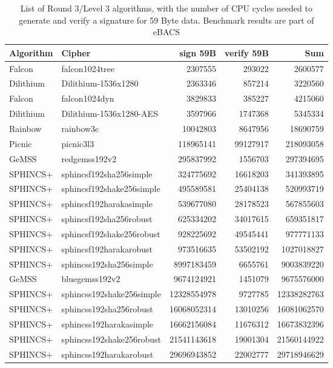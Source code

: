 \begin{table}[ht]
  \small
  \caption{List of Round 3/Level 3 algorithms, with the number of CPU cycles needed to generate and verify a signature for 59 Byte data. Benchmark results are part of eBACS\cite{eBACS}}
  \begin{center}
      \begin{tabularx}{\textwidth}{X|lrrr}
      \hline
      \textbf{Algorithm} & \textbf{Cipher}  & \textbf{sign 59B}  & \textbf{verify 59B}  & \textbf{Sum}  \\
      \hline
      Falcon & falcon1024tree & 2307555 & 293022 & 2600577 \\
      Dilithium & Dilithium-1536x1280 & 2363346 & 857214 & 3220560 \\
      Falcon & falcon1024dyn & 3829833 & 385227 & 4215060 \\
      Dilithium & Dilithium-1536x1280-AES & 3597966 & 1747368 & 5345334 \\
      Rainbow & rainbow3c & 10042803 & 8647956 & 18690759 \\
      Picnic & picnic3l3 & 118965141 & 99127917 & 218093058 \\
      GeMSS & redgemss192v2 & 295837992 & 1556703 & 297394695 \\
      SPHINCS+ & sphincsf192sha256simple & 324775692 & 16618203 & 341393895 \\
      SPHINCS+ & sphincsf192shake256simple & 495589581 & 25404138 & 520993719 \\
      SPHINCS+ & sphincsf192harakasimple & 539677080 & 28178523 & 567855603 \\
      SPHINCS+ & sphincsf192sha256robust & 625334202 & 34017615 & 659351817 \\
      SPHINCS+ & sphincsf192shake256robust & 928225692 & 49545441 & 977771133 \\
      SPHINCS+ & sphincsf192harakarobust & 973516635 & 53502192 & 1027018827 \\
      SPHINCS+ & sphincss192sha256simple & 8997183459 & 6655761 & 9003839220 \\
      GeMSS & bluegemss192v2 & 9674124921 & 1451079 & 9675576000 \\
      SPHINCS+ & sphincss192shake256simple & 12328554978 & 9727785 & 12338282763 \\
      SPHINCS+ & sphincss192sha256robust & 16068052314 & 13010256 & 16081062570 \\
      SPHINCS+ & sphincss192harakasimple & 16662156084 & 11676312 & 16673832396 \\
      SPHINCS+ & sphincss192shake256robust & 21541143618 & 19001304 & 21560144922 \\
      SPHINCS+ & sphincss192harakarobust & 29696943852 & 22002777 & 29718946629 \\
      \hline
  \end{tabularx}
  \end{center}
  \label{table:r3_dsa_latency}
\end{table}


